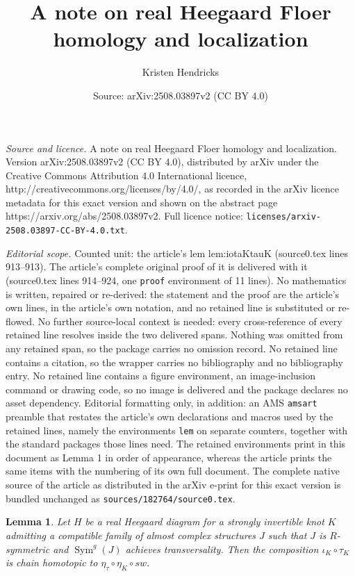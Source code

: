 \documentclass[10pt,a4paper]{amsart}
\title{A note on real Heegaard Floer homology and localization}
\author{Kristen Hendricks}
\date{Source: arXiv:2508.03897v2 (CC BY 4.0)}
\newtheorem{lem}{Lemma}
\DeclareMathOperator{\Sym}{{Sym}}
\begin{document}
\maketitle

\noindent\emph{Source and licence.} A note on real Heegaard Floer homology and localization. Version arXiv:2508.03897v2 (CC BY 4.0), distributed by arXiv under the Creative Commons Attribution 4.0 International licence, http://creativecommons.org/licenses/by/4.0/, as recorded in the arXiv licence metadata for this exact version and shown on the abstract page https://arxiv.org/abs/2508.03897v2. Full licence notice: \texttt{licenses/arxiv-2508.03897-CC-BY-4.0.txt}.\par\smallskip

\noindent\textit{Editorial scope.} Counted unit: the article's lem lem:iotaKtauK (source0.tex lines 913--913). The article's complete original proof of it is delivered with it (source0.tex lines 914--924, one \texttt{proof} environment of 11 lines). No mathematics is written, repaired or re-derived: the statement and the proof are the article's own lines, in the article's own notation, and no retained line is substituted or re-flowed.  No further source-local context is needed: every cross-reference of every retained line resolves inside the two delivered spans.  Nothing was omitted from any retained span, so the package carries no omission record.  No retained line contains a citation, so the wrapper carries no bibliography and no bibliography entry.  No retained line contains a figure environment, an image-inclusion command or drawing code, so no image is delivered and the package declares no asset dependency.  Editorial formatting only, in addition: an AMS \texttt{amsart} preamble that restates the article's own declarations and macros used by the retained lines, namely the environments \texttt{lem} on separate counters, together with the standard packages those lines need.  The retained environments print in this document as Lemma 1 in order of appearance, whereas the article prints the same items with the numbering of its own full document.  The complete native source of the article as distributed in the arXiv e-print for this exact version is bundled unchanged as \texttt{sources/182764/source0.tex}.
\begin{lem} \label{lem:iotaKtauK} Let $H$ be a real Heegaard diagram for a strongly invertible knot $K$ admitting a compatible family of almost complex structures $J$ such that $J$ is $R$-symmetric and $\Sym^g(J)$ achieves transversality. Then the composition $\iota_K \circ \tau_K$ is chain homotopic to $\eta_{\tau} \circ \eta_K \circ sw$. \end{lem}
\end{document}
